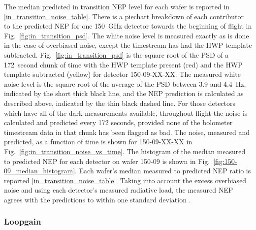 \documentclass[../EBEXPaper2.tex]{subfiles}
\begin{document}
The median predicted in transition \ac{NEP} level for each wafer is reported in \TAB\ref{in_transition_noise_table}. 
There is a piechart breakdown of each contributor to the predicted \ac{NEP} for one 150~GHz detector towards the beginning of flight in Fig.~\ref{fig:in_transition_psd}. 
The white noise level is measured exactly as is done in the case of overbiased noise, except the timestream has had the \ac{HWP} template subtracted. 
Fig.~\ref{fig:in_transition_psd} is the square root of the \ac{PSD} of a 172~second chunk of time with the \ac{HWP} template present (red) and the \ac{HWP} template subtracted (yellow) for detector 150-09-XX-XX. 
The measured white noise level is the square root of the average of the \ac{PSD} between 3.9 and 4.4~Hz, indicated by the short thick black line, and the \ac{NEP} prediction is calculated as described above, indicated by the thin black dashed line. 
For those detectors which have all of the dark measurements available, throughout flight the noise is calculated and predicted every 172 seconds, provided none of the bolometer timestream data in that chunk has been flagged as bad. 
The noise, measured and predicted, as a function of time is shown for 150-09-XX-XX in Fig.~\ref{fig:in_transition_noise_vs_time}. 
The histogram of the median measured to predicted \ac{NEP} for each detector on wafer 150-09 is shown in Fig.~\ref{fig:150-09_median_histogram}.
Each wafer's median measured to predicted \ac{NEP} ratio is reported \TAB\ref{in_transition_noise_table}. 
Taking into account the excess overbiased noise and using each detector's measured radiative load, the measured \ac{NEP} agrees with the predictions to within one standard deviation . 

\subsubsection{Loopgain}
\label{sec:loopgain}
\end{document}
